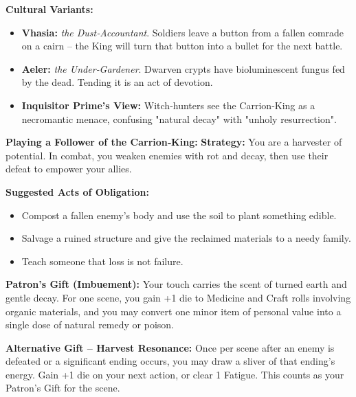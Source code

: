 \documentclass[10pt,a5paper]{book}
\begin{document}
\textbf{Cultural Variants:}
\begin{itemize}
    \item \textbf{Vhasia:} \textit{the Dust‑Accountant}. Soldiers leave a button from a fallen comrade on a cairn -- the King will turn that button into a bullet for the next battle.
    \item \textbf{Aeler:} \textit{the Under‑Gardener}. Dwarven crypts have bioluminescent fungus fed by the dead. Tending it is an act of devotion.
    \item \textbf{Inquisitor Prime's View:} Witch‑hunters see the Carrion‑King as a necromantic menace, confusing "natural decay" with "unholy resurrection".
\end{itemize}

\textbf{Playing a Follower of the Carrion‑King:}
\textbf{Strategy:} You are a harvester of potential. In combat, you weaken enemies with rot and decay, then use their defeat to empower your allies.

\textbf{Suggested Acts of Obligation:}
\begin{itemize}
    \item Compost a fallen enemy's body and use the soil to plant something edible.
    \item Salvage a ruined structure and give the reclaimed materials to a needy family.
    \item Teach someone that loss is not failure.
\end{itemize}

\textbf{Patron's Gift (Imbuement):} Your touch carries the scent of turned earth and gentle decay. For one scene, you gain +1 die to Medicine and Craft rolls involving organic materials, and you may convert one minor item of personal value into a single dose of natural remedy or poison.

\textbf{Alternative Gift -- Harvest Resonance:} Once per scene after an enemy is defeated or a significant ending occurs, you may draw a sliver of that ending's energy. Gain +1 die on your next action, or clear 1 Fatigue. This counts as your Patron's Gift for the scene.
\end{document}
